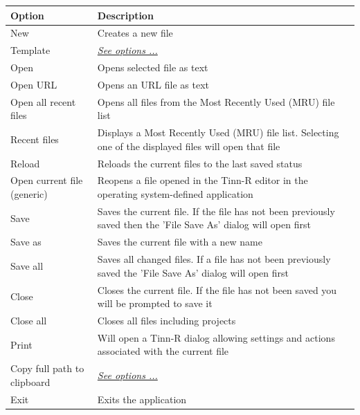 \begin{scriptsize}
  \begin{tabularx}{\textwidth}{>{\hsize=0.4\hsize}X>{\hsize=0.8\hsize}X}\\
    \hline
    \textbf{Option} & \textbf{Description} \\
    \hline
    New & Creates a new file \\
    Template & \textit{\href{\#menu\_file\_template}{See options ...}} \\
    \hdashline[1pt/1pt]
    Open & Opens selected file as text \\
    Open URL & Opens an URL file as text \\
    Open all recent files & Opens all files from the Most Recently Used (MRU) file list \\
    Recent files & Displays a Most Recently Used (MRU) file list.
     Selecting one of the displayed files will open that file \\
    Reload & Reloads the current files to the last saved status \\
    Open current file (generic) & Reopens a file opened in the Tinn-R editor in the
     operating system-defined application \\
    \hdashline[1pt/1pt]
    Save & Saves the current file.
     If the file has not been previously saved then the 'File Save As' dialog will open first \\
    Save as & Saves the current file with a new name \\
    Save all & Saves all changed files.
     If a file has not been previously saved the 'File Save As' dialog will open first \\
    \hdashline[1pt/1pt]
    Close & Closes the current file. If the file has not been saved you will be prompted to save it \\
    Close all & Closes all files including projects \\
    Print & Will open a Tinn-R dialog allowing settings and actions associated with the current file \\
    \hdashline[1pt/1pt]
    Copy full path to clipboard & \textit{\href{\#menu\_file\_copyfullpath}{See options ...}} \\
    \hdashline[1pt/1pt]
    Exit & Exits the application \\
    \hline
  \end{tabularx}
\end{scriptsize}

\hypertarget{menu_file_template}{}

